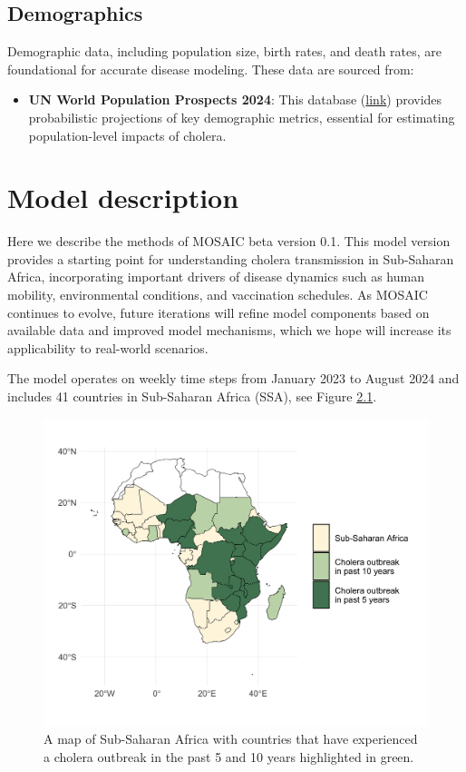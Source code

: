 \documentclass[
]{book}
\providecommand{\tightlist}{%
  \setlength{\itemsep}{0pt}\setlength{\parskip}{0pt}}
\begin{document}
\section{Demographics}\label{demographics}

Demographic data, including population size, birth rates, and death rates, are foundational for accurate disease modeling. These data are sourced from:

\begin{itemize}
\tightlist
\item
  \textbf{UN World Population Prospects 2024}: This database (\href{https://population.un.org/wpp/Download/}{link}) provides probabilistic projections of key demographic metrics, essential for estimating population-level impacts of cholera.
\end{itemize}

\chapter{Model description}\label{model-description}

Here we describe the methods of MOSAIC beta version 0.1. This model version provides a starting point for understanding cholera transmission in Sub-Saharan Africa, incorporating important drivers of disease dynamics such as human mobility, environmental conditions, and vaccination schedules. As MOSAIC continues to evolve, future iterations will refine model components based on available data and improved model mechanisms, which we hope will increase its applicability to real-world scenarios.

The model operates on weekly time steps from January 2023 to August 2024 and includes 41 countries in Sub-Saharan Africa (SSA), see Figure \ref{fig:map}.

\begin{figure}

{\centering \includegraphics[width=1\linewidth]{figures/africa_map} 

}

\caption{A map of Sub-Saharan Africa with countries that have experienced a cholera outbreak in the past 5 and 10 years highlighted in green.}\label{fig:map}
\end{figure}
\end{document}
